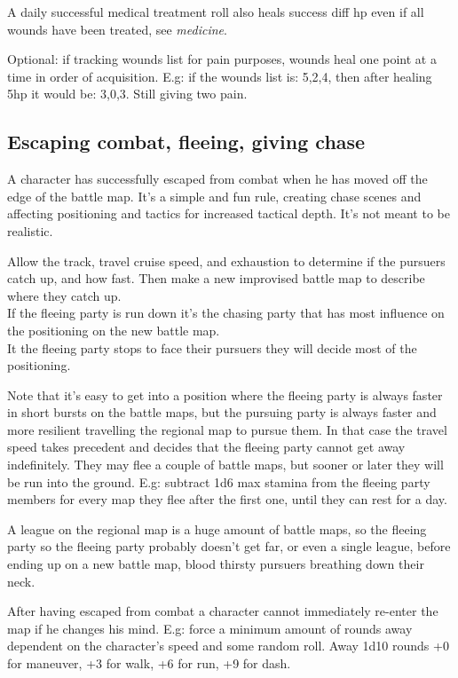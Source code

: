 A daily successful medical treatment roll also heals success diff hp even if all wounds have been treated, see \emph{medicine}.

Optional: if tracking wounds list for pain purposes, wounds heal one point at a time in order of acquisition. E.g: if the wounds list is: 5,2,4, then after healing 5hp it would be: 3,0,3. Still giving two pain.


\subsection*{Escaping combat, fleeing, giving chase}
A character has successfully escaped from combat when he has moved off the edge of the battle map. It's a simple and fun rule, creating chase scenes and affecting positioning and tactics for increased tactical depth. It's not meant to be realistic.

Allow the track, travel cruise speed, and exhaustion to determine if the pursuers catch up, and how fast. Then make a new improvised battle map to describe where they catch up.\\
If the fleeing party is run down it's the chasing party that has most influence on the positioning on the new battle map.\\
It the fleeing party stops to face their pursuers they will decide most of the positioning.

Note that it's easy to get into a position where the fleeing party is always faster in short bursts on the battle maps, but the pursuing party is always faster and more resilient travelling the regional map to pursue them. In that case the travel speed takes precedent and decides that the fleeing party cannot get away indefinitely. They may flee a couple of battle maps, but sooner or later they will be run into the ground. E.g: subtract 1d6 max stamina from the fleeing party members for every map they flee after the first one, until they can rest for a day.

A league on the regional map is a huge amount of battle maps, so the fleeing party so the fleeing party probably doesn't get far, or even a single league, before ending up on a new battle map, blood thirsty pursuers breathing down their neck.

After having escaped from combat a character cannot immediately re-enter the map if he changes his mind. E.g: force a minimum amount of rounds away dependent on the character's speed and some random roll. Away 1d10 rounds +0 for maneuver, +3 for walk, +6 for run, +9 for dash.


